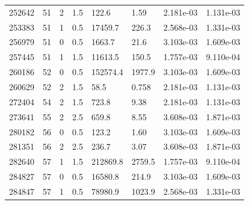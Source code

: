 \documentclass[preview]{standalone}
\begin{document}
{{{\begin{tabular}{L{1.2cm}C{1.2cm} C{0.3cm}C{0.5cm} C{1.4cm}C{1.4cm} C{1.4cm}C{1.4cm}}
  252642  &    51  & 2     & 1.5 &  122.6  & 1.59  & 2.181e-03 &  1.131e-03   \\ 
  253383  &    51  & 1     & 0.5 &  17459.7  & 226.3  & 2.568e-03 &  1.331e-03   \\ 
  256979  &    51  & 0     & 0.5 &  1663.7  & 21.6  & 3.103e-03 &  1.609e-03   \\ 
  257445  &    51  & 1     & 1.5 &  11613.5  & 150.5  & 1.757e-03 &  9.110e-04   \\ 
  260186  &    52  & 0     & 0.5 &  152574.4  & 1977.9  & 3.103e-03 &  1.609e-03   \\ 
  260629  &    52  & 2     & 1.5 &  58.5  & 0.758  & 2.181e-03 &  1.131e-03   \\ 
  272404  &    54  & 2     & 1.5 &  723.8  & 9.38  & 2.181e-03 &  1.131e-03   \\ 
  273641  &    55  & 2     & 2.5 &  659.8  & 8.55  & 3.608e-03 &  1.871e-03   \\ 
  280182  &    56  & 0     & 0.5 &  123.2  & 1.60  & 3.103e-03 &  1.609e-03   \\ 
  281351  &    56  & 2     & 2.5 &  236.7  & 3.07  & 3.608e-03 &  1.871e-03   \\ 
  282640  &    57  & 1     & 1.5 &  212869.8  & 2759.5  & 1.757e-03 &  9.110e-04   \\ 
  284827  &    57  & 0     & 0.5 &  16580.8  & 214.9  & 3.103e-03 &  1.609e-03   \\ 
  284847  &    57  & 1     & 0.5 &  78980.9  & 1023.9  & 2.568e-03 &  1.331e-03   \\ 
\hline 
\end{tabular} 

}}}
\end{document}
